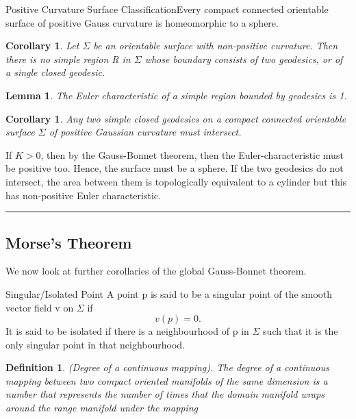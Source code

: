 \documentclass[twoside]{article}
\newtheorem{lemma}[theorem]{Lemma}
\newtheorem{corollary}[theorem]{Corollary}
\newtheorem{definition}[theorem]{Definition}
\newenvironment{proof}{{\bf Proof:}}{\hfill\rule{2mm}{2mm}}
\begin{document}
\begin{proposition_exam}{Positive Curvature Surface Classification}{}Every compact connected orientable surface of positive Gauss curvature is homeomorphic to a sphere.
\end{proposition_exam}

\begin{corollary}Let $\Sigma$ be an orientable surface with non-positive curvature. Then there is no simple region R in $\Sigma$ whose boundary consists of two geodesics, or of a single closed geodesic.
\end{corollary}

\begin{lemma}The Euler characteristic of a simple region bounded by geodesics is 1.
\end{lemma}

\begin{corollary}Any two simple closed geodesics on a compact connected orientable surface $\Sigma$ of positive Gaussian curvature must intersect.
\end{corollary}

\begin{proof} If $K > 0$, then by the Gauss-Bonnet theorem, then the Euler-characteristic must be positive too. Hence, the surface must be a sphere. If the two geodesics do not intersect, the area between them is topologically equivalent to a cylinder but this has non-positive Euler characteristic.
\end{proof}

\subsection{Morse's Theorem}

We now look at further corollaries of the global Gauss-Bonnet theorem.

\begin{definition_exam}{Singular/Isolated Point}{} A point p is said to be a singular point of the smooth vector field v on $\Sigma$ if 
$$
v(p) = 0.
$$
It is said to be isolated if there is a neighbourhood of p in $\Sigma$ such that it is the only singular point in that neighbourhood.
\end{definition_exam}

\begin{definition}(Degree of a continuous mapping). The degree of a continuous mapping between two compact oriented manifolds of the same dimension is a number that represents the number of times that the domain manifold wraps around the range manifold under the mapping
\end{definition}
\end{document}
